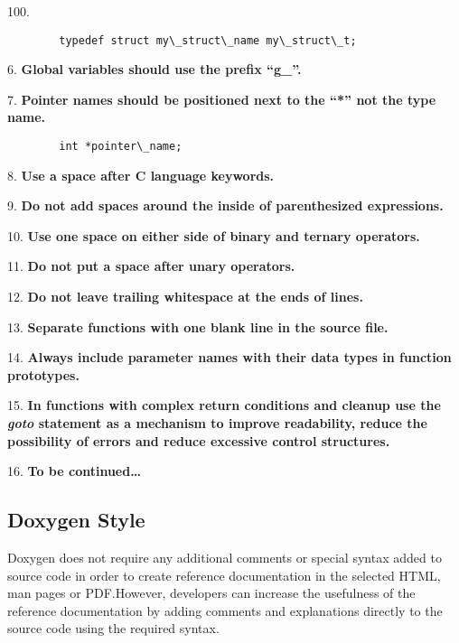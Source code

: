 \begin{labeling}{100.}
\begin{verbatim}
        typedef struct my\_struct\_name my\_struct\_t;
   \end{verbatim}
\item [6.] \textbf{Global variables should use the prefix ``g\_''.}\\
\item [7.] \textbf{Pointer names should be positioned next to the ``*'' not the type name.}
   \begin{verbatim}
        int *pointer\_name;
   \end{verbatim}
\item [8.] \textbf{Use a space after C language keywords.}\\
\item [9.] \textbf{Do not add spaces around the inside of parenthesized expressions.}\\
\item [10.] \textbf{Use one space on either side of binary and ternary operators.}\\
\item [11.] \textbf{Do not put a space after unary operators.}\\
\item [12.] \textbf{Do not leave trailing whitespace at the ends of lines.}\\
\item [13.] \textbf{Separate functions with one blank line in the source file.}\\
\item [14.] \textbf{Always include parameter names with their data types in function prototypes.}\\
\item [15.] \textbf{In functions with complex return conditions and cleanup use the \textit{goto} statement as a mechanism to improve readability, reduce the possibility of errors and reduce excessive control structures.}
\item [16.] \textbf{To be continued\ldots}
\end{labeling}

\subsection{Doxygen Style}

Doxygen does not require any additional comments or special syntax added to source code in order to create reference documentation in the selected HTML, man pages or PDF.\@ However, developers can increase the usefulness of the reference documentation by adding comments and explanations directly to the source code using the required syntax.

